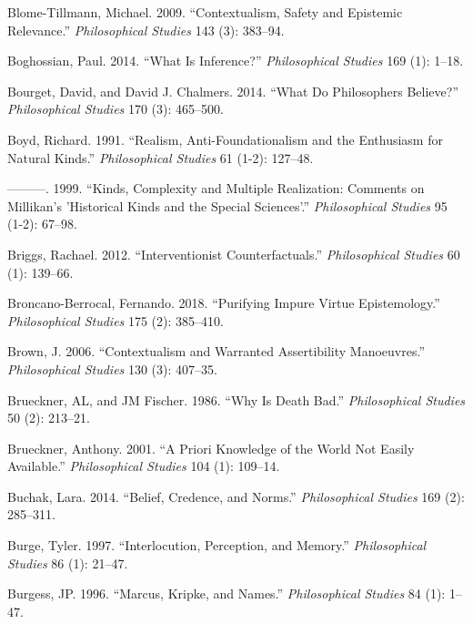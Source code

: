 \documentclass[
  10pt,
  letterpaper,
  DIV=11,
  numbers=noendperiod,
  twoside]{scrartcl}
\newlength{\cslhangindent}
\newenvironment{CSLReferences}[2] %
 {\begin{list}{}{%
  \setlength{\itemindent}{0pt}
  \setlength{\leftmargin}{0pt}
  \setlength{\parsep}{0pt}
  \ifodd #1
   \setlength{\leftmargin}{\cslhangindent}
   \setlength{\itemindent}{-1\cslhangindent}
  \fi
  \setlength{\itemsep}{#2\baselineskip}}}
 {\end{list}}
\begin{document}
\begin{CSLReferences}{1}{0}
Blome-Tillmann, Michael. 2009. {``Contextualism, Safety and Epistemic
Relevance.''} \emph{Philosophical Studies} 143 (3): 383--94.

Boghossian, Paul. 2014. {``What Is Inference?''} \emph{Philosophical
Studies} 169 (1): 1--18.

Bourget, David, and David J. Chalmers. 2014. {``What Do Philosophers
Believe?''} \emph{Philosophical Studies} 170 (3): 465--500.

Boyd, Richard. 1991. {``Realism, Anti-Foundationalism and the Enthusiasm
for Natural Kinds.''} \emph{Philosophical Studies} 61 (1-2): 127--48.

---------. 1999. {``Kinds, Complexity and Multiple Realization: Comments
on Millikan's 'Historical Kinds and the Special Sciences'.''}
\emph{Philosophical Studies} 95 (1-2): 67--98.

Briggs, Rachael. 2012. {``Interventionist Counterfactuals.''}
\emph{Philosophical Studies} 60 (1): 139--66.

Broncano-Berrocal, Fernando. 2018. {``Purifying Impure Virtue
Epistemology.''} \emph{Philosophical Studies} 175 (2): 385--410.

Brown, J. 2006. {``Contextualism and Warranted Assertibility
Manoeuvres.''} \emph{Philosophical Studies} 130 (3): 407--35.

Brueckner, AL, and JM Fischer. 1986. {``Why Is Death Bad.''}
\emph{Philosophical Studies} 50 (2): 213--21.

Brueckner, Anthony. 2001. {``A Priori Knowledge of the World Not Easily
Available.''} \emph{Philosophical Studies} 104 (1): 109--14.

Buchak, Lara. 2014. {``Belief, Credence, and Norms.''}
\emph{Philosophical Studies} 169 (2): 285--311.

Burge, Tyler. 1997. {``Interlocution, Perception, and Memory.''}
\emph{Philosophical Studies} 86 (1): 21--47.

Burgess, JP. 1996. {``Marcus, Kripke, and Names.''} \emph{Philosophical
Studies} 84 (1): 1--47.


\end{CSLReferences}
\end{document}

